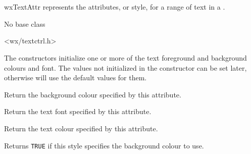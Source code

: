 
\section{}\label{wxtextattr}

wxTextAttr represents the attributes, or style, for a range of text in a\rtfsp
{}.


No base class


<wx/textctrl.h>


\label{wxtextattrctor}



The constructors initialize one or more of the text foreground and background
colours and font. The values not initialized in the constructor can be set
later, otherwise  will use
the default values for them.



Return the background colour specified by this attribute.



Return the text font specified by this attribute.



Return the text colour specified by this attribute.



Returns {\tt TRUE} if this style specifies the background colour to use.


